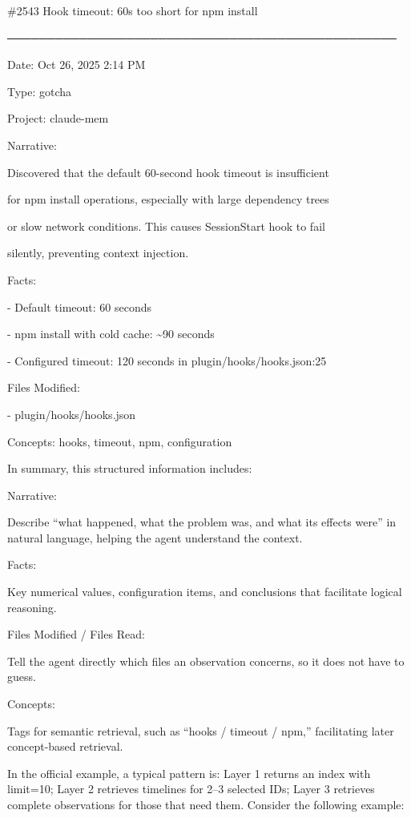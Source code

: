 \#2543 Hook timeout: 60s too short for npm install

─────────────────────────────────────────────────

Date: Oct 26, 2025 2:14 PM

Type: gotcha

Project: claude-mem

Narrative:

Discovered that the default 60-second hook timeout is insufficient

for npm install operations, especially with large dependency trees

or slow network conditions. This causes SessionStart hook to fail

silently, preventing context injection.

Facts:

- Default timeout: 60 seconds

- npm install with cold cache: \textasciitilde90 seconds

- Configured timeout: 120 seconds in plugin/hooks/hooks.json:25

Files Modified:

- plugin/hooks/hooks.json

Concepts: hooks, timeout, npm, configuration

In summary, this structured information includes:

Narrative:

Describe ``what happened, what the problem was, and what its effects were'' in natural language, helping the agent understand the context.

Facts:

Key numerical values, configuration items, and conclusions that facilitate logical reasoning.

Files Modified / Files Read:

Tell the agent directly which files an observation concerns, so it does not have to guess.

Concepts:

Tags for semantic retrieval, such as ``hooks / timeout / npm,'' facilitating later concept-based retrieval.

In the official example, a typical pattern is: Layer 1 returns an index with limit=10; Layer 2 retrieves timelines for 2--3 selected IDs; Layer 3 retrieves complete observations for those that need them. Consider the following example:

